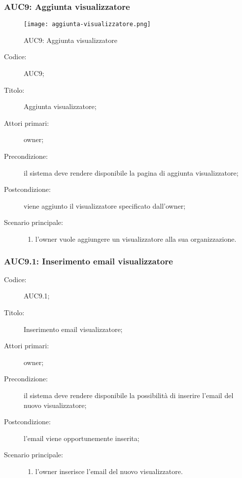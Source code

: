 \documentclass[../../../analisi-dei-requisiti.tex]{subfiles}
\begin{document}
\subsubsection{AUC9: Aggiunta visualizzatore}%
\label{subs:AUC9}

\begin{figure}[H]
  \centering
  \texttt{[image: aggiunta-visualizzatore.png]}
  \caption{AUC9: Aggiunta visualizzatore}%
  \label{fig:AUC9}
\end{figure}

\begin{description}
  \item[Codice:] AUC9;
  \item[Titolo:] Aggiunta visualizzatore;
  \item[Attori primari:] owner;
  \item[Precondizione:] il sistema deve rendere disponibile la pagina di aggiunta visualizzatore;
  \item[Postcondizione:] viene aggiunto il visualizzatore specificato dall'owner;
  \item[Scenario principale:]
  \begin{enumerate}
    \item l'owner vuole aggiungere un visualizzatore alla sua organizzazione.
  \end{enumerate}
\end{description}

\subsubsection{AUC9.1: Inserimento email visualizzatore}%
\label{subs:AUC9.1}
\begin{description}
  \item[Codice:] AUC9.1;
  \item[Titolo:] Inserimento email visualizzatore;
  \item[Attori primari:] owner;
  \item[Precondizione:] il sistema deve rendere disponibile la possibilità di inserire l'email del nuovo visualizzatore;
  \item[Postcondizione:] l'email viene opportunemente inserita;
  \item[Scenario principale:]
  \begin{enumerate}
    \item l'owner inserisce l'email del nuovo visualizzatore.
  \end{enumerate}
\end{description}
\end{document}
